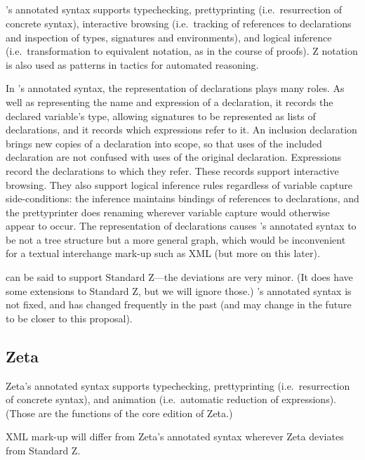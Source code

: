 \documentclass{llncs}  %
\newcommand{\Zeta}{Zeta}
\begin{document}
\subsection{\CADiZ}

\CADiZ's annotated syntax supports typechecking,
prettyprinting (i.e.\ resurrection of concrete syntax),
interactive browsing (i.e.\ tracking of references to declarations
and inspection of types, signatures and environments),
and logical inference (i.e.\ transformation to equivalent notation,
as in the course of proofs).
Z notation is also used as patterns in tactics for automated reasoning.

In \CADiZ's annotated syntax,
the representation of declarations plays many roles.
As well as representing the name and expression of a declaration,
it records the declared variable's type,
allowing signatures to be represented as lists of declarations,
and it records which expressions refer to it.
An inclusion declaration brings new copies of a declaration into scope,
so that uses of the included declaration are not
confused with uses of the original declaration.
Expressions record the declarations to which they refer.
These records support interactive browsing.
They also support logical inference rules
regardless of variable capture side-conditions:
the inference maintains bindings of references to declarations,
and the prettyprinter does renaming
wherever variable capture would otherwise appear to occur.
The representation of declarations causes \CADiZ's annotated syntax
to be not a tree structure but a more general graph,
which would be inconvenient for a textual interchange mark-up such as XML
(but more on this later).

\CADiZ\cite{CADiZ} can be said to support Standard Z---the deviations
are very minor.
(It does have some extensions to Standard Z, but we will ignore those.)
\CADiZ's annotated syntax is not fixed, and has changed frequently in the
past (and may change in the future to be closer to this proposal). 

\subsection{\Zeta}

\Zeta's annotated syntax supports typechecking,
prettyprinting (i.e.\ resurrection of concrete syntax),
and animation (i.e.\ automatic reduction of expressions).
(Those are the functions of the core edition of \Zeta.)

XML mark-up will differ from \Zeta's annotated syntax
wherever \Zeta\cite{Zeta} deviates from Standard Z.
\end{document}
